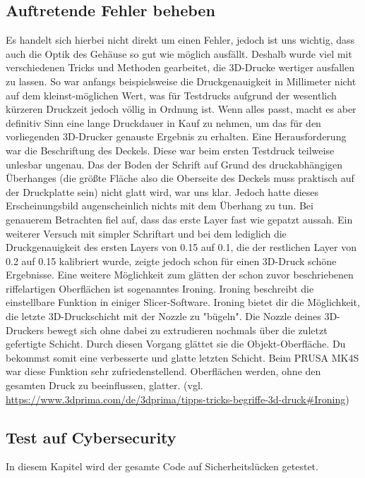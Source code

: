 \documentclass[]{article}
\begin{document}
\subsection{Auftretende Fehler beheben}
Es handelt sich hierbei nicht direkt um einen Fehler, jedoch ist uns wichtig, dass auch die Optik des Gehäuse so gut wie möglich ausfällt. Deshalb wurde viel mit verschiedenen Tricks und Methoden gearbeitet, die 3D-Drucke wertiger ausfallen zu lassen.\newline
So war anfangs beispielsweise die Druckgenauigkeit in Millimeter nicht auf dem kleinst-möglichen Wert, was für Testdrucks aufgrund der wesentlich kürzeren Druckzeit jedoch völlig in Ordnung ist. Wenn alles passt, macht es aber definitiv Sinn eine lange Druckdauer in Kauf zu nehmen, um das für den vorliegenden 3D-Drucker genauste Ergebnis zu erhalten.\newline
Eine Herausforderung war die Beschriftung des Deckels. Diese war beim ersten Testdruck teilweise unlesbar ungenau. Das der \glqq Boden\grqq{} der Schrift auf Grund des druckabhängigen Überhanges (die größte Fläche also die Oberseite des Deckels muss praktisch auf der Druckplatte sein) nicht glatt wird, war uns klar. Jedoch hatte dieses Erscheinungsbild augenscheinlich nichts mit dem Überhang zu tun. Bei genauerem Betrachten fiel auf, dass das erste Layer fast wie gepatzt aussah. Ein weiterer Versuch mit simpler Schriftart und bei dem lediglich die Druckgenauigkeit des ersten Layers von 0.15 auf 0.1, die der restlichen Layer von 0.2 auf 0.15 kalibriert wurde, zeigte jedoch schon für einen 3D-Druck schöne Ergebnisse.\newline
Eine weitere Möglichkeit zum glätten der schon zuvor beschriebenen riffelartigen Oberflächen ist sogenanntes Ironing. \glqq Ironing beschreibt die einstellbare Funktion in einiger Slicer-Software. Ironing bietet dir die Möglichkeit, die letzte 3D-Druckschicht mit der Nozzle zu "bügeln". Die Nozzle deines 3D-Druckers bewegt sich ohne dabei zu extrudieren nochmals über die zuletzt gefertigte Schicht. Durch diesen Vorgang glättet sie die Objekt-Oberfläche. Du bekommst somit eine verbesserte und glatte letzten Schicht.\grqq{} Beim PRUSA MK4S war diese Funktion sehr zufriedenstellend. Oberflächen werden, ohne den gesamten Druck zu beeinflussen, glatter.\newline
\vspace{4mm}\newline
(vgl. \url{https://www.3dprima.com/de/3dprima/tipps-tricks-begriffe-3d-druck#Ironing})
\subsection{Test auf Cybersecurity}
In diesem Kapitel wird der gesamte Code auf Sicherheitslücken getestet.
\end{document}
